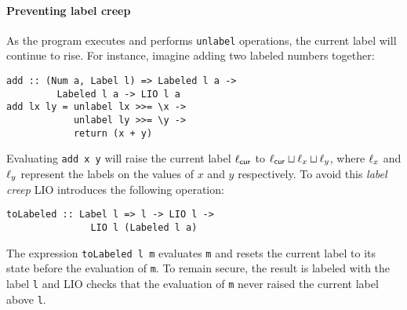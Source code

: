 \paragraph{Preventing label creep}
As the program executes and performs \texttt{unlabel} operations, the current label will continue to rise. For instance, imagine adding two labeled numbers together:
\begin{verbatim}
add :: (Num a, Label l) => Labeled l a ->
         Labeled l a -> LIO l a
add lx ly = unlabel lx >>= \x ->
            unlabel ly >>= \y ->
            return (x + y)
\end{verbatim}
Evaluating \texttt{add x y} will raise the current label $\ell_{\mathsf{cur}}$ to $\ell_{\mathsf{cur}} \sqcup \ell_x \sqcup \ell_y$, where $\ell_x$ and $\ell_y$ represent the labels on the values of $x$ and $y$ respectively. To avoid this \emph{label creep} LIO introduces the following operation:
\begin{verbatim}
toLabeled :: Label l => l -> LIO l ->
               LIO l (Labeled l a)
\end{verbatim}
The expression \texttt{toLabeled l m} evaluates \texttt{m} and resets the current label to its state before the evaluation of \texttt{m}. To remain secure, the result is labeled with the label \texttt{l} and LIO checks that the evaluation of \texttt{m} never raised the current label above \texttt{l}.